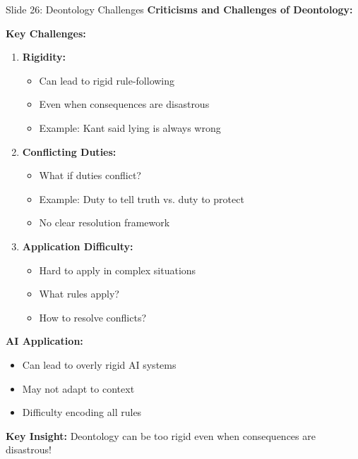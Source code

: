 \documentclass[8pt]{beamer}
\begin{document}
	\begin{frame}{Slide 26: Deontology Challenges}
		\fontsize{6.5}{7.5}\selectfont
		\textbf{Criticisms and Challenges of Deontology:}
		
		\vspace{0.1cm}
		\textbf{Key Challenges:}
		\begin{enumerate}
			\item \textbf{Rigidity:}
			\begin{itemize}
				\item Can lead to rigid rule-following
				\item Even when consequences are disastrous
				\item Example: Kant said lying is always wrong
			\end{itemize}
			\item \textbf{Conflicting Duties:}
			\begin{itemize}
				\item What if duties conflict?
				\item Example: Duty to tell truth vs. duty to protect
				\item No clear resolution framework
			\end{itemize}
			\item \textbf{Application Difficulty:}
			\begin{itemize}
				\item Hard to apply in complex situations
				\item What rules apply?
				\item How to resolve conflicts?
			\end{itemize}
		\end{enumerate}
		
		\vspace{0.1cm}
		\textbf{AI Application:}
		\begin{itemize}
			\item Can lead to overly rigid AI systems
			\item May not adapt to context
			\item Difficulty encoding all rules
		\end{itemize}
		
		\textcolor{myblue}{\textbf{Key Insight:}} Deontology can be \textcolor{myblue}{too rigid} even when consequences are disastrous!
	\end{frame}
	
\end{document}
